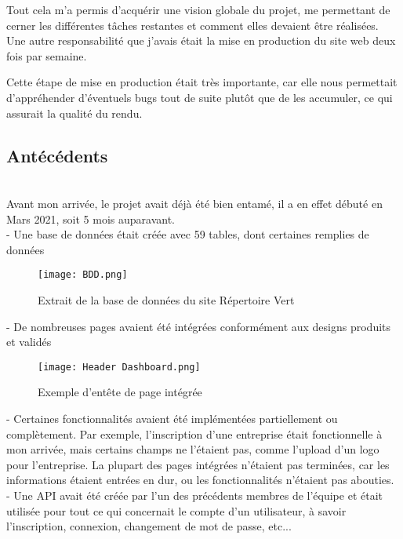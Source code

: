 Tout cela m'a permis d'acquérir une vision globale du projet, me permettant de cerner les différentes tâches restantes et comment elles devaient être réalisées.\\

Une autre responsabilité que j'avais était la mise en production du site web deux fois par semaine. 

Cette étape de mise en production était très importante, car elle nous permettait d'appréhender d'éventuels bugs tout de suite plutôt que de les accumuler, ce qui assurait la qualité du rendu.


\pagebreak
\subsection{Antécédents}
~\\
Avant mon arrivée, le projet avait déjà été bien entamé, il a en effet débuté en Mars 2021, soit 5 mois auparavant. \\
- Une base de données était créée avec 59 tables, dont certaines remplies de données \\

\begin{figure}[H]
    \centering
    \texttt{[image: BDD.png]}
    \caption{Extrait de la base de données du site Répertoire Vert}
\end{figure}

- De nombreuses pages avaient été intégrées conformément aux designs produits et validés \\

\begin{figure}[H]
    \centering
    \texttt{[image: Header Dashboard.png]}
    \caption{Exemple d'entête de page intégrée}
\end{figure}

- Certaines fonctionnalités avaient été implémentées partiellement ou complètement. Par exemple, l'inscription d'une entreprise était fonctionnelle à mon arrivée, mais certains champs ne l'étaient pas, comme l'upload d'un logo pour l'entreprise.
La plupart des pages intégrées n'étaient pas terminées, car les informations étaient entrées en dur, ou les fonctionnalités n'étaient pas abouties. \\

- Une API avait été créée par l'un des précédents membres de l'équipe et était utilisée pour tout ce qui concernait le compte d'un utilisateur, à savoir l'inscription, connexion, changement de mot de passe, etc... \\

